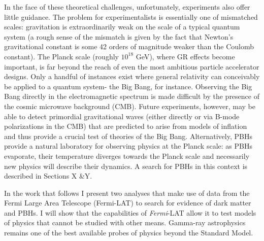 In the face of these theoretical challenges, unfortunately, experiments also offer little guidance.
The problem for experimentalists is essentially one of mismatched scales: gravitation is extraordinarily weak on the scale of a typical quantum system (a rough sense of the mismatch is given by the fact that Newton's gravitational constant is some 42 orders of magnitude weaker than the Coulomb constant).
The Planck scale (roughly $10^{18}$ GeV), where GR effects become important, is far beyond the reach of even the most ambitious particle accelerator designs.
Only a handful of instances exist where general relativity can conceivably be applied to a quantum system- the Big Bang, for instance.
Observing the Big Bang directly in the electromagnetic spectrum is made difficult by the presence of the cosmic microwave background (CMB).
Future experiments, however, may be able to detect primordial gravitational waves (either directly or via B-mode polarizations in the CMB) that are predicted to arise from models of inflation and thus provide a crucial test of theories of the Big Bang.
Alternatively, PBHs provide a natural laboratory for observing physics at the Planck scale: as PBHs evaporate, their temperature diverges towards the Planck scale and necessarily new physics will describe their dynamics. A search for PBHs in this context is described in Sections X \&Y.

In the work that follows I present two analyses that make use of data from the Fermi Large Area Telescope (Fermi-LAT) to search for evidence of dark matter and PBHs. I will show that the capabilities of {\it{Fermi}}-LAT allow it to test models of physics that cannot be studied with other means. Gamma-ray astrophysics remains one of the best available probes of physics beyond the Standard Model.

